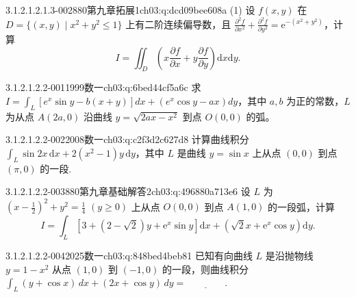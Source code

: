 \begin{q}{3.1.2.1.2.1.3-002}{880第九章拓展1}{ch03:q:dcd09bee608a}
(1) 设 $f(x,y)$ 在 $D=\{(x,y)\mid x^2+y^2\le 1\}$ 上有二阶连续偏导数，且 $\frac{\partial^2 f}{\partial x^2}+\frac{\partial^2 f}{\partial y^2}=\mathrm{e}^{-(x^2+y^2)}$，计算
\[
I=\iint_D \left(x\frac{\partial f}{\partial x}+y\frac{\partial f}{\partial y}\right)\mathrm{d}x\mathrm{d}y.
\]
\end{q}

\par\addvspace{2.4ex}\noindent
\begin{minipage}{\linewidth}

\begin{q}{3.1.2.1.2.2-001}{1999数一}{ch03:q:6bed44cf5a6c}
求 $\displaystyle I = \int_L \left[ e^x \sin y - b(x+y) \right] dx + \left( e^x \cos y - a x \right) dy$，其中 $a,b$ 为正的常数，$L$ 为从点 $A(2a,0)$ 沿曲线 $y=\sqrt{2ax-x^2}$ 到点 $O(0,0)$ 的弧。
\end{q}
\end{minipage}


\begin{q}{3.1.2.1.2.2-002}{2008数一}{ch03:q:c2f3d2c627d8}
计算曲线积分 $\displaystyle \int_L \sin 2x\,\mathrm{d}x + 2(x^2-1)y\,\mathrm{d}y$，其中 $L$ 是曲线 $y=\sin x$ 上从点 $(0,0)$ 到点 $(\pi,0)$ 的一段.
\end{q}

\begin{q}{3.1.2.1.2.2-003}{880第九章基础解答2}{ch03:q:496880a713e6}
设 $L$ 为 $\left(x-\frac{1}{2}\right)^2+y^2=\frac{1}{4}$ $(y\geqslant 0)$ 上从点 $O(0,0)$ 到点 $A(1,0)$ 的一段弧，计算
\[ I=\int_L \left[3+(2-\sqrt{2})y+\mathrm{e}^x\sin y\right]\mathrm{d}x+\left(\sqrt{2}x+\mathrm{e}^x\cos y\right)\mathrm{d}y. \]
\end{q}

\begin{q}{3.1.2.1.2.2-004}{2025数一}{ch03:q:848bed4beb81}
已知有向曲线 $L$ 是沿抛物线 $y=1-x^2$ 从点 $(1,0)$ 到 $(-1,0)$ 的一段，则曲线积分
$\displaystyle \int_L (y+\cos x)\,dx+(2x+\cos y)\,dy=\underline{\hspace{4em}}.$
\end{q}

